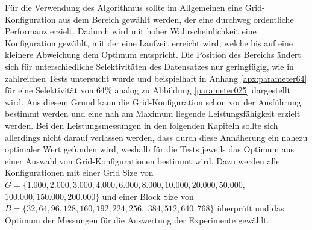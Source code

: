 Für die Verwendung des Algorithmus sollte im Allgemeinen eine Grid-Konfiguration aus dem Bereich gewählt werden, der eine durchweg ordentliche Performanz erzielt.
Dadurch wird mit hoher Wahrscheinlichkeit eine Konfiguration gewählt, mit der eine Laufzeit erreicht wird, welche bis auf eine kleinere Abweichung dem Optimum entspricht.
Die Position des Bereichs ändert sich für unterschiedliche Selektivitäten des Datensatzes nur geringfügig, wie in zahlreichen Tests untersucht wurde und beispielhaft in Anhang \ref{apx:parameter64} für eine Selektivität von 64\% analog zu Abbildung \ref{parameter025} dargestellt wird.
Aus diesem Grund kann die Grid-Konfiguration schon vor der Ausführung bestimmt werden und eine nah am Maximum liegende Leistungsfähigkeit erzielt werden.
Bei den Leistungsmessungen in den folgenden Kapiteln sollte sich allerdings nicht darauf verlassen werden, dass durch diese Annäherung ein nahezu optimaler Wert gefunden wird, weshalb für die Tests jeweils das Optimum aus einer Auswahl von Grid-Konfigurationen bestimmt wird.
Dazu werden alle Konfigurationen mit einer Grid Size von $G=\{1.000, 2.000, 3.000, 4.000, 6.000, 8.000, 10.000, 20.000, 50.000,$ $100.000, 150.000, 200.000\}$ und einer Block Size von $B=\{32, 64, 96, 128, 160, 192, 224, 256,$ $384, 512, 640, 768\}$ überprüft und das Optimum der Messungen für die Auswertung der Experimente gewählt.